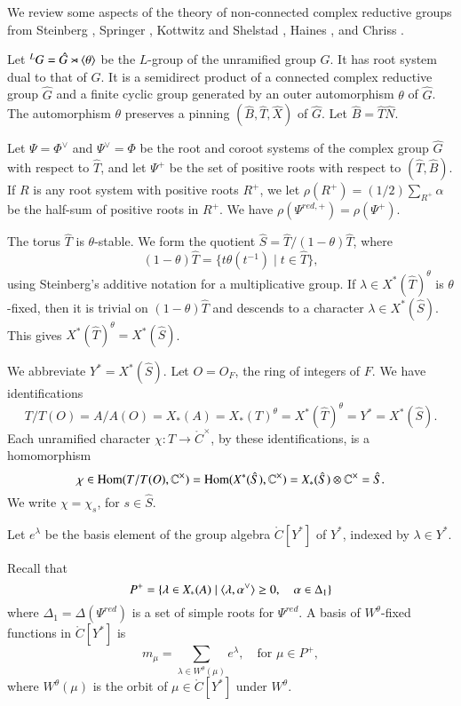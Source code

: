 We review some aspects of the theory of non-connected complex
reductive groups from Steinberg \cite{steinberg1968endomorphisms},
Springer \cite{springer2010linear}, Kottwitz and Shelstad
\cite{kottwitz1999foundations}, Haines \cite{haines2016dualities}, and
Chriss \cite{chriss}.

Let ${}^LG = \hat G \rtimes \langle{\theta}\rangle$ be the $L$-group of the
unramified group $G$.  It has root system dual to that of $G$.  It is
a semidirect product of a connected complex reductive group $\hat G$
and a finite cyclic group generated by an outer automorphism $\theta$
of $\hat G$.  The automorphism $\theta$ preserves a pinning $(\hat
B,\hat T,\hat X)$ of $\hat G$. Let $\hat B = \hat T\hat N$.

Let $\Psi=\Phi^\vee$ and $\Psi^\vee=\Phi$ be the root and coroot
systems of the complex group $\hat G$ with respect to $\hat T$, and
let $\Psi^+$ be the set of positive roots with respect to $(\hat
T,\hat B)$.  If $R$ is any root system with positive roots $R^+$, we
let $\rho(R^+) = (1/2)\sum_{R^+} \alpha$ be the half-sum of positive roots in $R^+$.  We have
$\rho(\Psi^{red,+}) = \rho(\Psi^+)$.

The torus $\hat T$ is $\theta$-stable.  We form the quotient $\hat S =
\hat T/(1-\theta) \hat T$, where
\[
(1-\theta)\hat T = \{ t\theta(t^{-1}) \mid t\in \hat T\},
\]
using Steinberg's additive notation for a multiplicative group.  If $\lambda\in
X^*(\hat T)^\theta$ is $\theta$-fixed, then it is trivial on
$(1-\theta)\hat T$ and descends to a character $\lambda\in X^*(\hat
S)$.  This gives $X^*(\hat T)^\theta = X^*(\hat S)$.

We abbreviate $Y^* = X^*(\hat S)$. Let $O=O_F$, the ring of integers of $F$.  
We have identifications
\begin{equation}\label{eqn:identify}
T/T(O)=A/A(O)=X_*(A)=X_*(T)^\theta  =X^*(\hat T)^\theta = Y^* = X^*(\hat S).
\end{equation}
Each unramified character $\chi:T\to \ring{C}^\times$, by these
identifications, is a homomorphism
\begin{equation}
\chi\in{\operatorname{Hom}}(T/T(O),\mathbb{C}^\times) = 
{\operatorname{Hom}}(X^*(\hat S),\mathbb{C}^\times) = 
X_*(\hat S)\otimes \mathbb{C}^\times = \hat S.
\end{equation}
We write $\chi = \chi_s$, for $s\in\hat S$.

Let $e^\lambda$ be the basis element of the group algebra
$\ring{C}[Y^*]$ of $Y^*$, indexed by $\lambda\in Y^*$.

Recall that
\[
P^+ = \{\lambda\in X_*(A) \mid \langle{\lambda,\alpha^\vee}\rangle\ge 0,
\quad \alpha\in \Delta_1\}
\]
where $\Delta_1=\Delta(\Psi^{red})$ is a set of simple roots for $\Psi^{red}$.
A basis of $W^\theta$-fixed functions in $\ring{C}[Y^*]$ is
\begin{equation}\label{eqn:mmu}
m_\mu = \sum_{\lambda\in W^\theta(\mu)} e^\lambda, 
\quad \text{for }\mu\in P^+,
\end{equation}
where $W^\theta(\mu)$ is the orbit of $\mu\in\ring{C}[Y^*]$ under
$W^\theta$.

